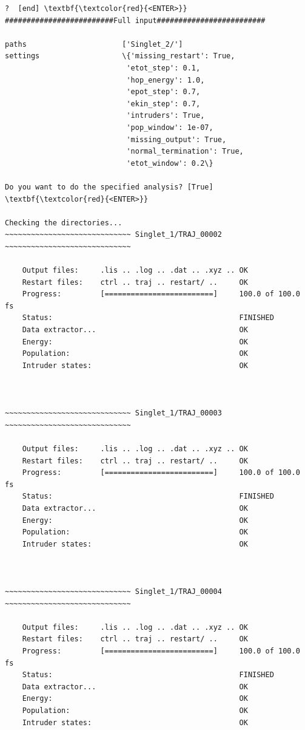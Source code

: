 \documentclass[a4paper,11pt,DIV=15,openany]{scrbook}
\begin{document}
\begin{oframed}
\begin{Verbatim}[commandchars=\\\{\}]
?  [end] \textbf{\textcolor{red}{<ENTER>}}
#########################Full input#########################

paths                      ['Singlet_2/']
settings                   \{'missing_restart': True, 
                            'etot_step': 0.1, 
                            'hop_energy': 1.0, 
                            'epot_step': 0.7, 
                            'ekin_step': 0.7, 
                            'intruders': True, 
                            'pop_window': 1e-07, 
                            'missing_output': True, 
                            'normal_termination': True, 
                            'etot_window': 0.2\}

Do you want to do the specified analysis? [True] \textbf{\textcolor{red}{<ENTER>}}

Checking the directories...
~~~~~~~~~~~~~~~~~~~~~~~~~~~~~ Singlet_1/TRAJ_00002 ~~~~~~~~~~~~~~~~~~~~~~~~~~~~~

    Output files:     .lis .. .log .. .dat .. .xyz .. OK
    Restart files:    ctrl .. traj .. restart/ ..     OK
    Progress:         [=========================]     100.0 of 100.0 fs
    Status:                                           FINISHED
    Data extractor...                                 OK
    Energy:                                           OK
    Population:                                       OK
    Intruder states:                                  OK



~~~~~~~~~~~~~~~~~~~~~~~~~~~~~ Singlet_1/TRAJ_00003 ~~~~~~~~~~~~~~~~~~~~~~~~~~~~~

    Output files:     .lis .. .log .. .dat .. .xyz .. OK
    Restart files:    ctrl .. traj .. restart/ ..     OK
    Progress:         [=========================]     100.0 of 100.0 fs
    Status:                                           FINISHED
    Data extractor...                                 OK
    Energy:                                           OK
    Population:                                       OK
    Intruder states:                                  OK



~~~~~~~~~~~~~~~~~~~~~~~~~~~~~ Singlet_1/TRAJ_00004 ~~~~~~~~~~~~~~~~~~~~~~~~~~~~~

    Output files:     .lis .. .log .. .dat .. .xyz .. OK
    Restart files:    ctrl .. traj .. restart/ ..     OK
    Progress:         [=========================]     100.0 of 100.0 fs
    Status:                                           FINISHED
    Data extractor...                                 OK
    Energy:                                           OK
    Population:                                       OK
    Intruder states:                                  OK




\end{Verbatim}
\end{oframed}
\end{document}
